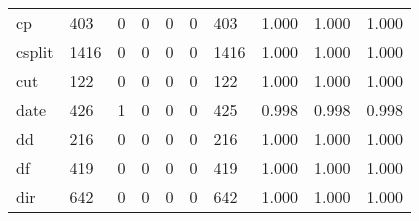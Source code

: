 \begin{longtable}{lp{2.0cm}p{2.0cm}p{2.0cm}p{2.0cm}p{2.0cm}p{2.0cm}p{2.0cm}p{2.0cm}p{2.0cm}}
cp        &                    403 &                                  0 &                                 0 &                                0 &                                 0 &                             403 &                                1.000 &                                  1.000 &                                1.000 \\
csplit    &                   1416 &                                  0 &                                 0 &                                0 &                                 0 &                            1416 &                                1.000 &                                  1.000 &                                1.000 \\
cut       &                    122 &                                  0 &                                 0 &                                0 &                                 0 &                             122 &                                1.000 &                                  1.000 &                                1.000 \\
date      &                    426 &                                  1 &                                 0 &                                0 &                                 0 &                             425 &                                0.998 &                                  0.998 &                                0.998 \\
dd        &                    216 &                                  0 &                                 0 &                                0 &                                 0 &                             216 &                                1.000 &                                  1.000 &                                1.000 \\
df        &                    419 &                                  0 &                                 0 &                                0 &                                 0 &                             419 &                                1.000 &                                  1.000 &                                1.000 \\
dir       &                    642 &                                  0 &                                 0 &                                0 &                                 0 &                             642 &                                1.000 &                                  1.000 &                                1.000 \\

\end{longtable}
